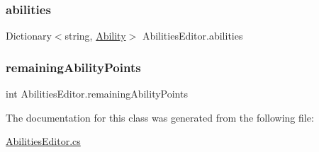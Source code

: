 \subsubsection{\texorpdfstring{abilities}{abilities}}
{\footnotesize\ttfamily Dictionary$<$string, \mbox{\hyperlink{class_ability}{Ability}}$>$ Abilities\+Editor.\+abilities}

\mbox{\label{class_abilities_editor_ae5617857224baec0dd3a14e218fe25f7}} 
\subsubsection{\texorpdfstring{remaining\+Ability\+Points}{remainingAbilityPoints}}
{\footnotesize\ttfamily int Abilities\+Editor.\+remaining\+Ability\+Points}



The documentation for this class was generated from the following file\+:\begin{DoxyCompactItemize}
\item 
\mbox{\hyperlink{_abilities_editor_8cs}{Abilities\+Editor.\+cs}}\end{DoxyCompactItemize}
